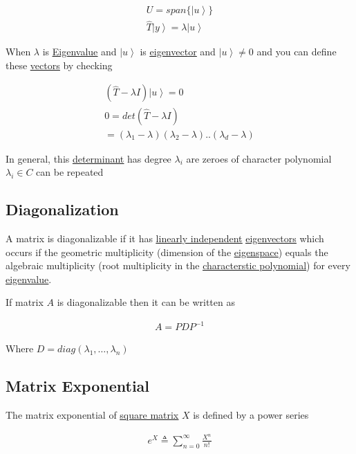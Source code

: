 \documentclass[
]{article}
\let\oldhyperref\hyperref
\renewcommand{\hyperref}[2][]{\oldhyperref[#1]{\underline{#2}}}
\providecommand{\ket}[1]{\left\lvert #1 \right\rangle}
\providecommand{\infin}{\infty}
\begin{document}
\begin{gather*}
	U=span\{\ket{u}\}\\
	\hat{T}\ket{y}=\lambda \ket{u}
\end{gather*}

When \(\lambda\) is \hyperref[eigenvectorseigenvalues]{Eigenvalue} and \(\ket{u}\) is \hyperref[eigenvectorseigenvalues]{eigenvector} and
\(\ket{u}\neq 0\) and you can define these \hyperref[vectors]{vectors} by checking

\begin{gather*}
	(\hat{T}-\lambda I)\ket{u}=0\\
	0=det(\hat{T}-\lambda I)\\
	=(\lambda_1-\lambda)(\lambda_2-\lambda)..(\lambda_d-\lambda)
\end{gather*}

In general, this \hyperref[determinants]{determinant} has degree \(\lambda_i\) are zeroes of
character polynomial \(\lambda_i\in C\) can be repeated

\subsection{Diagonalization}\label{diagonalization}

A matrix is diagonalizable if it has \hyperref[linear-independence]{linearly independent} \hyperref[eigenvectorseigenvalues]{eigenvectors}
which occurs if the geometric multiplicity (dimension of the \hyperref[eigenspaces]{eigenspace})
equals the algebraic multiplicity (root multiplicity in the
\hyperref[characteristic-polynomial]{characterstic polynomial}) for every \hyperref[eigenvectorseigenvalues]{eigenvalue}.

If matrix \(A\) is diagonalizable then it can be written as

\begin{gather*}
	A=PDP^{-1}
\end{gather*}

Where \(D=diag(\lambda_1, … , \lambda_n)\)

\subsection{Matrix Exponential}\label{matrix-exponentials}

The matrix exponential of
\hyperref[square-matrix]{square
	matrix} \(X\) is defined by a power series

\begin{gather*}
	e^X\triangleq \sum_{n=0}^\infin\frac{X^n}{n!}
\end{gather*}
\end{document}
